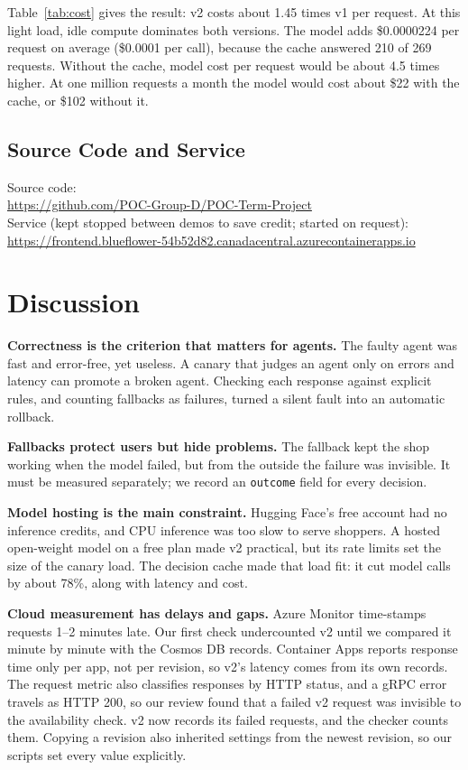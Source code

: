 \documentclass[conference]{IEEEtran}
\begin{document}
Table~\ref{tab:cost} gives the result: v2 costs about 1.45 times v1 per
request. At this light load, idle compute dominates both versions. The model
adds \$0.0000224 per request on average (\$0.0001 per call), because the
cache answered 210 of 269 requests. Without the cache, model cost per
request would be about 4.5 times higher. At one million requests a month
the model would cost about \$22 with the cache, or \$102 without it.

\subsection{Source Code and Service}
\noindent Source code:\\
\url{https://github.com/POC-Group-D/POC-Term-Project}\\[2pt]
Service (kept stopped between demos to save credit; started on request):\\
\url{https://frontend.blueflower-54b52d82.canadacentral.azurecontainerapps.io}

\section{Discussion}

\textbf{Correctness is the criterion that matters for agents.} The faulty
agent was fast and error-free, yet useless. A canary that judges an agent
only on errors and latency can promote a broken agent. Checking each
response against explicit rules, and counting fallbacks as failures, turned
a silent fault into an automatic rollback.

\textbf{Fallbacks protect users but hide problems.} The fallback kept the
shop working when the model failed, but from the outside the failure was
invisible. It must be measured separately; we record an \texttt{outcome}
field for every decision.

\textbf{Model hosting is the main constraint.} Hugging Face's free account
had no inference credits, and CPU inference was too slow to serve shoppers.
A hosted open-weight model on a free plan made v2 practical, but its
rate limits set the size of the canary load. The decision cache made that
load fit: it cut model calls by about 78\%, along with latency and cost.

\textbf{Cloud measurement has delays and gaps.} Azure Monitor time-stamps
requests 1--2 minutes late. Our first check undercounted v2 until we compared
it minute by minute with the Cosmos DB records. Container Apps reports
response time only per app, not per revision, so v2's latency comes from its
own records. The request metric also classifies responses by HTTP status,
and a gRPC error travels as HTTP 200, so our review found that a failed v2
request was invisible to the availability check. v2 now records its failed
requests, and the checker counts them. Copying a revision also inherited
settings from the newest revision, so our scripts set every value
explicitly.
\end{document}
